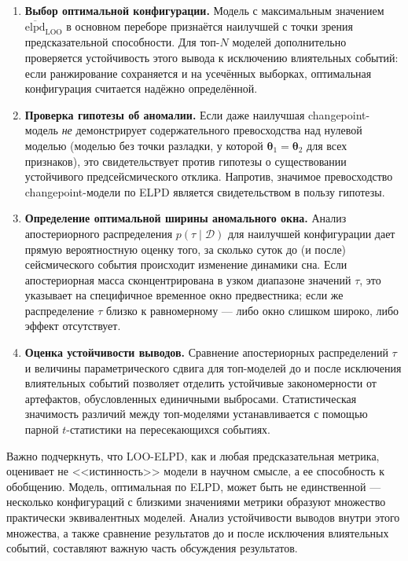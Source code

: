 \documentclass[14pt]{mmcs_article}
\begin{document}
	\begin{enumerate}
		\item \textbf{Выбор оптимальной конфигурации.}
		Модель с максимальным значением
		$\overline{\mathrm{elpd}}_{\mathrm{LOO}}$ в основном
		переборе признаётся наилучшей с точки зрения
		предсказательной способности. Для топ-$N$ моделей
		дополнительно проверяется устойчивость этого вывода к
		исключению влиятельных событий: если ранжирование
		сохраняется и на усечённых выборках, оптимальная
		конфигурация считается надёжно определённой.
		
		\item \textbf{Проверка гипотезы об аномалии.}
		Если даже наилучшая changepoint-модель \textit{не}
		демонстрирует содержательного превосходства над нулевой
		моделью (моделью без точки разладки, у которой
		$\boldsymbol{\theta}_1 = \boldsymbol{\theta}_2$ для всех
		признаков), это свидетельствует против гипотезы о
		существовании устойчивого предсейсмического отклика.
		Напротив, значимое превосходство changepoint-модели по
		ELPD является свидетельством в пользу гипотезы.
		
		\item \textbf{Определение оптимальной ширины аномального
			окна.} Анализ апостериорного распределения
		$p(\tau \mid \mathcal{D})$ для наилучшей конфигурации
		дает прямую вероятностную оценку того, за сколько суток
		до (и после) сейсмического события происходит изменение
		динамики сна. Если апостериорная масса сконцентрирована в
		узком диапазоне значений $\tau$, это указывает на
		специфичное временное окно предвестника; если же
		распределение $\tau$ близко к равномерному — либо окно
		слишком широко, либо эффект отсутствует.
		
		\item \textbf{Оценка устойчивости выводов.}
		Сравнение апостериорных распределений $\tau$ и величины
		параметрического сдвига для топ-моделей до и после
		исключения влиятельных событий позволяет отделить
		устойчивые закономерности от артефактов, обусловленных
		единичными выбросами. Статистическая значимость различий
		между топ-моделями устанавливается с помощью парной
		$t$-статистики на пересекающихся событиях.
	\end{enumerate}
	
	Важно подчеркнуть, что LOO-ELPD, как и любая предсказательная
	метрика, оценивает не <<истинность>> модели в научном смысле, а
	ее способность к обобщению. Модель, оптимальная по ELPD, может
	быть не единственной — несколько конфигураций с близкими
	значениями метрики образуют множество практически эквивалентных
	моделей. Анализ устойчивости выводов внутри этого множества, а
	также сравнение результатов до и после исключения влиятельных
	событий, составляют важную часть обсуждения результатов.
	
\end{document}
